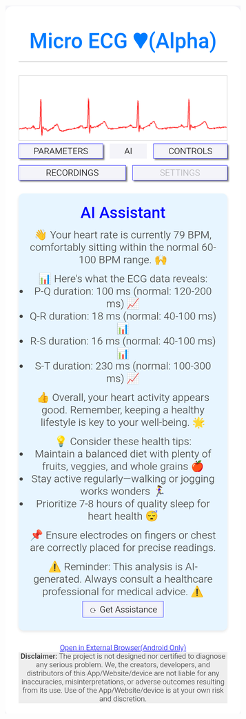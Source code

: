 \begin{figure}
    \centering
    \begin{subfigure}[b]{0.45\textwidth}
        \includegraphics[width=\textwidth]{images/result-AI.png}

\end{subfigure}
\end{figure}
